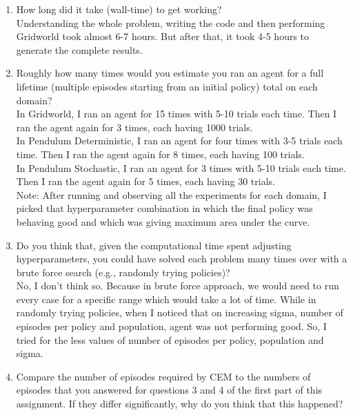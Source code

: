 \documentclass{article}
\begin{document}
\begin{enumerate}
\item How long did it take (wall-time) to get working?\\

Understanding the whole problem, writing the code and then performing Gridworld took almost 6-7 hours. But after that, it took 4-5 hours to generate the complete results.

\item Roughly how many times would you estimate you ran an agent for a full lifetime (multiple episodes starting from an initial policy) total on each domain?\\

In Gridworld, I ran an agent for 15 times with 5-10 trials each time. Then I ran the agent again for 3 times, each having 1000 trials. \\
In Pendulum Deterministic, I ran an agent for four times with 3-5 trials each time. Then I ran the agent again for 8 times, each having 100 trials.\\
In Pendulum Stochastic, I ran an agent for 3 times with 5-10 trials each time. Then I ran the agent again for 5 times, each having 30 trials.\\

Note: After running and observing all the experiments for each domain, I picked that hyperparameter combination in which the final policy was behaving good and which was giving maximum area under the curve.

\item Do you think that, given the computational time spent adjusting hyperparameters, you could have solved each problem many times over with a brute force search (e.g., randomly trying policies)?\\

No, I don't think so. Because in brute force approach, we would need to run every case for a specific range which would take a lot of time. While in randomly trying policies, when I noticed that on increasing sigma, number of episodes per policy and population, agent was not performing good. So, I tried for the less values of number of episodes per policy, population and sigma.

\item Compare the number of episodes required by CEM to the numbers of episodes that you answered for questions 3 and 4 of the first part of this assignment. If they differ significantly, why do you think that this happened?\\


\end{enumerate}
\end{document}
